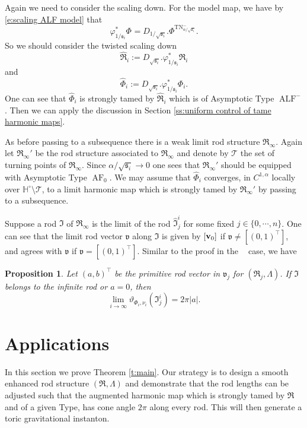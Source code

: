 \documentclass[a4paper,11pt]{amsart}
\newtheorem{proposition}[theorem]{Proposition}
\theoremstyle{definition}
\numberwithin{equation}{section}
\newcommand{\dH}{\mathbb{H}}
\newcommand{\mv} {\mathfrak v}
\newcommand{\ms} {\mathfrak s}
\newcommand{\mI} {\mathfrak I}
\newcommand{\mR} {\mathfrak R}
\DeclareMathOperator{\bv}{{\bf v}}
\DeclareMathOperator{\ALF}{ALF}
\DeclareMathOperator{\TN}{TN}
\DeclareMathOperator{\TNam}{TN^{--}_\alpha}
\DeclareMathOperator{\AF}{AF}
\DeclareMathOperator{\AFa}{AF_\beta}
\begin{document}
Again we need to consider the scaling down. For the model map, we have by \eqref{e:scaling ALF model} that 
$$\varphi_{1/\ms_i}^*\Phi^{\TNam}=D_{1/\sqrt{\ms_i}}. \Phi^{\TN^-_{\alpha/\sqrt{\ms_i}}}.$$
So we should consider the twisted scaling down $$\widehat{\mR}_{i}:=D_{\sqrt{\ms_i}}. \varphi_{1/\ms_i}^*\mR_i$$ and $$\widehat{\Phi}_i:=D_{\sqrt{\ms_i}}. \varphi_{1/\ms_i}^*\Phi_i. $$
One can see that $\widehat{\Phi}_i$ is strongly tamed by $\widehat{\mR}_i$ which is of Asymptotic Type $\ALF^-$.  Then we can apply the discussion in Section \ref{ss:uniform control of tame harmonic maps}. 


As before passing to a subsequence there is a weak limit rod structure $\mR_\infty$. Again let $\mR_\infty'$ be the rod structure associated to $\mR_\infty$ and denote by $\mathcal T$ the set of turning points of $\mR_\infty$. Since $\alpha/\sqrt{\ms_i}\rightarrow 0$ one sees that $\mR_\infty'$ should be equipped with Asymptotic Type $\AF_0$. We may assume that $\widehat\Phi_i$ converges, in $C^{1, \alpha}$ locally over $\dH^\circ\setminus \mathcal T$, to a limit harmonic map which is strongly tamed by $\mR_\infty'$ by passing to a subsequence. 

Suppose a rod $\mI$ of $\mR_\infty$ is the limit of the rod $\widehat{\mI}_j^i$ for some fixed $j\in \{0, \cdots, n\}$. One can see that the limit rod vector $\mv$ along $\mI$ is given by $[\bv_0]$ if $\mv\neq [(0, 1)^\top]$, and agrees with $\mv$ if $\mv=[(0, 1)^\top]$. Similar to the proof in the $\AFa$ case, we have 

\begin{proposition} \label{p:cone angle TN rod length go to infinity}
Let $(a, b)^\top$ be the primitive rod vector in $\mv_j$ for $(\mR_j, \Lambda)$.  If $\mI$ belongs to the infinite rod or $a=0$, then
    $$\lim_{i\rightarrow\infty}\vartheta_{\Phi_i, \nu_i}(\mI_j^i)= 2\pi |a|.$$
\end{proposition}



\section{Applications}\label{sec:applications}
In this section we prove Theorem \ref{t:main}. Our strategy is to design a smooth enhanced rod structure \((\mR, \Lambda)\) and demonstrate that the rod lengths can be adjusted such that the augmented harmonic map which is strongly tamed by \(\mR\) and of a given Type, has  cone angle  \(2\pi\) along every rod. This will then generate a toric gravitational instanton.
\end{document}
